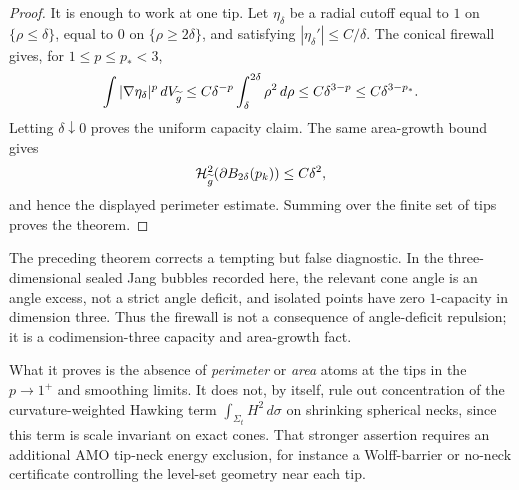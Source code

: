 \begin{proof}
It is enough to work at one tip.  Let $\eta_\delta$ be a radial cutoff equal to
$1$ on $\{\rho\le\delta\}$, equal to $0$ on $\{\rho\ge2\delta\}$, and satisfying
$|\eta_\delta'|\le C/\delta$.  The conical firewall gives, for
$1\le p\le p_*<3$,
\[
    \int |\nabla\eta_\delta|^p\,dV_{\widetilde{g}}
    \le
    C\delta^{-p}\int_\delta^{2\delta}\rho^2\,d\rho
    \le
    C\delta^{3-p}
    \le
    C\delta^{3-p_*}.
\]
Letting $\delta\downarrow0$ proves the uniform capacity claim.  The same
area-growth bound gives
\[
    \mathcal H^2_{\widetilde{g}}(\partial B_{2\delta}(p_k))
    \le
    C\delta^2,
\]
and hence the displayed perimeter estimate.  Summing over the finite set of
tips proves the theorem.
\end{proof}

\begin{remark}\label{rem:TipFirewallScope}
The preceding theorem corrects a tempting but false diagnostic.  In the
three-dimensional sealed Jang bubbles recorded here, the relevant cone angle is
an angle excess, not a strict angle deficit, and isolated points have zero
\(1\)-capacity in dimension three.  Thus the firewall is not a consequence of
angle-deficit repulsion; it is a codimension-three capacity and area-growth
fact.

What it proves is the absence of \emph{perimeter} or \emph{area} atoms at the
tips in the \(p\to1^+\) and smoothing limits.  It does not, by itself, rule out
concentration of the curvature-weighted Hawking term
$\int_{\Sigma_t}H^2\,d\sigma$ on shrinking spherical necks, since this term is
scale invariant on exact cones.  That stronger assertion requires an additional
AMO tip-neck energy exclusion, for instance a Wolff-barrier or no-neck
certificate controlling the level-set geometry near each tip.
\end{remark}

